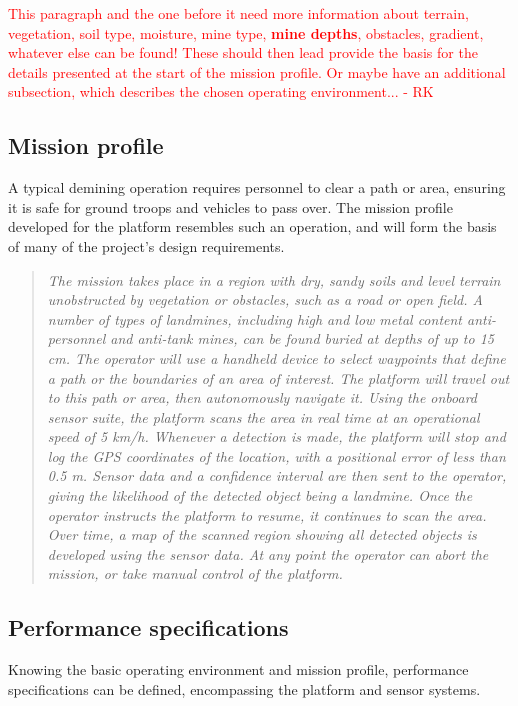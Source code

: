 \documentclass[main.tex]{subfiles}
\begin{document}
\textcolor{red}{This paragraph and the one before it need more information about terrain, vegetation, soil type, moisture, mine type, \textbf{mine depths}, obstacles, gradient, whatever else can be found! These should then lead provide the basis for the details presented at the start of the mission profile. Or maybe have an additional subsection, which describes the chosen operating environment... - RK}

\subsection{Mission profile}
A typical demining operation requires personnel to clear a path or area, ensuring it is safe for ground troops and vehicles to pass over. The mission profile developed for the platform resembles such an operation, and will form the basis of many of the project's design requirements.
\begin{quote}\textit{The mission takes place in a region with dry, sandy soils and level terrain unobstructed by vegetation or obstacles, such as a road or open field. A number of types of landmines, including high and low metal content anti-personnel and anti-tank mines, can be found buried at depths of up to 15 cm. The operator will use a handheld device to select waypoints that define a path or the boundaries of an area of interest. The platform will travel out to this path or area, then autonomously navigate it. Using the onboard sensor suite, the platform scans the area in real time at an operational speed of 5 km/h. Whenever a detection is made, the platform will stop and log the GPS coordinates of the location, with a positional error of less than 0.5 m. Sensor data and a confidence interval are then sent to the operator, giving the likelihood of the detected object being a landmine. Once the operator instructs the platform to resume, it continues to scan the area. Over time, a map of the scanned region showing all detected objects is developed using the sensor data. At any point the operator can abort the mission, or take manual control of the platform.}
\end{quote}

\subsection{Performance specifications}
Knowing the basic operating environment and mission profile, performance specifications can be defined, encompassing the platform and sensor systems.
\end{document}

